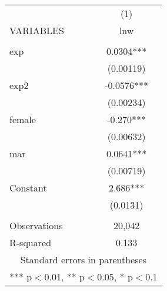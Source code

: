 \begin{tabular}{lc} \hline
 & (1) \\
VARIABLES & lnw \\ \hline
 &  \\
exp & 0.0304*** \\
 & (0.00119) \\
exp2 & -0.0576*** \\
 & (0.00234) \\
female & -0.270*** \\
 & (0.00632) \\
mar & 0.0641*** \\
 & (0.00719) \\
Constant & 2.686*** \\
 & (0.0131) \\
 &  \\
Observations & 20,042 \\
 R-squared & 0.133 \\ \hline
\multicolumn{2}{c}{ Standard errors in parentheses} \\
\multicolumn{2}{c}{ *** p$<$0.01, ** p$<$0.05, * p$<$0.1} \\
\end{tabular}
